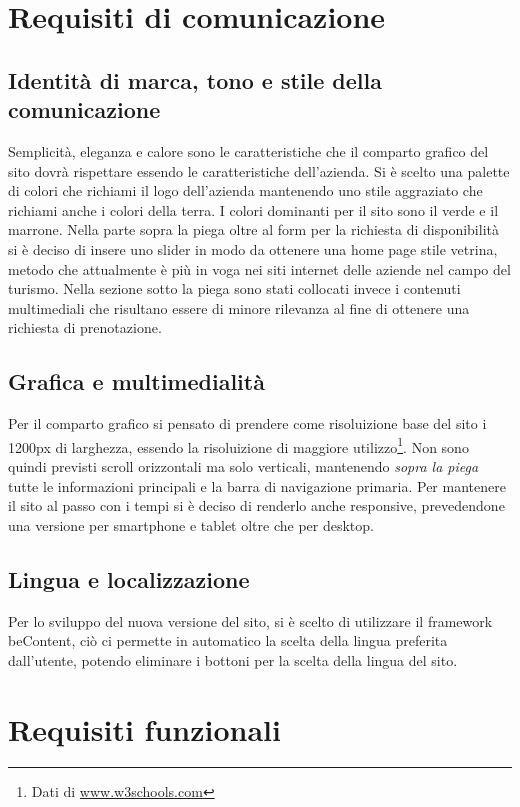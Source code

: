 \documentclass[a4paper,12pt,hidelinks]{report}
\begin{document}
\section{Requisiti di comunicazione}
  \subsection{Identità di marca, tono e stile della comunicazione}
    Semplicità, eleganza e calore sono le caratteristiche che il comparto grafico del sito dovrà rispettare essendo le caratteristiche dell'azienda. 
    Si è scelto una palette di colori che richiami il logo dell'azienda mantenendo uno stile aggraziato che richiami anche i colori della terra. I colori dominanti per il sito
    sono il verde e il marrone. Nella parte sopra la piega oltre al form per la richiesta di disponibilità si è deciso di insere uno slider in modo da ottenere una home page
    stile vetrina, metodo che attualmente è più in voga nei siti internet delle aziende nel campo del turismo. Nella sezione sotto la piega sono stati collocati invece i contenuti multimediali
    che risultano essere di minore rilevanza al fine di ottenere una richiesta di prenotazione.

  \subsection{Grafica e multimedialità}
    Per il comparto grafico si pensato di prendere come risoluizione base del sito i 1200px di larghezza, essendo la risoluizione di maggiore utilizzo\footnote{Dati di \url{www.w3schools.com}}.
    Non sono quindi previsti scroll orizzontali ma solo verticali, mantenendo \textit{sopra la piega} tutte le informazioni principali e la barra di navigazione primaria. Per mantenere
    il sito al passo con i tempi si è deciso di renderlo anche responsive, prevedendone una versione per smartphone e tablet oltre che per desktop.
  \subsection{Lingua e localizzazione}
    Per lo sviluppo del nuova versione del sito, si è scelto di utilizzare il framework beContent, ciò ci permette in automatico la scelta della lingua preferita dall'utente, potendo eliminare i bottoni per la 
    scelta della lingua del sito. 

\section{Requisiti funzionali}
\end{document}
